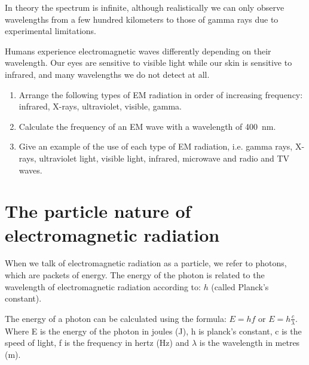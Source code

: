 In theory the spectrum is infinite, although realistically we can only observe wavelengths from a few hundred kilometers to those of gamma rays due to experimental limitations. 

Humans experience electromagnetic waves differently depending on their wavelength. Our eyes are sensitive to visible light while our skin is sensitive to infrared, and many wavelengths we do not detect at all.

{
\begin{enumerate}
\item Arrange the following types of EM radiation in order of increasing frequency: infrared, X-rays, ultraviolet, visible, gamma. 
\item Calculate the frequency of an EM wave with a wavelength of 400~nm.
\item Give an example of the use of each type of EM radiation, i.e. gamma rays, X-rays, ultraviolet light, visible light, infrared, microwave and radio and TV waves.
\end{enumerate}

}

\section{The particle nature of electromagnetic radiation}

When we talk of electromagnetic radiation as a particle, we refer to photons, which are packets of energy. The energy of the photon is related to the wavelength of electromagnetic radiation according to:
$h$ (called Planck's constant).







The energy of a photon can be calculated using the formula: $E=hf$ or $E=h \frac{c}{\lambda}$.
Where E is the energy of the photon in joules (J), h is planck's constant, c is the speed of light, f is the frequency in hertz (Hz) and $\lambda$ is the wavelength in metres (m).

